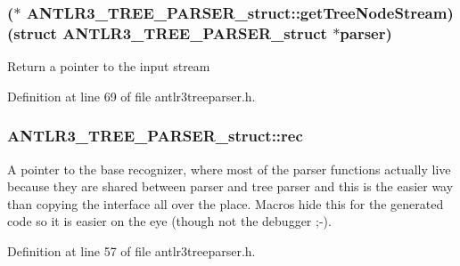 \hypertarget{struct_a_n_t_l_r3___t_r_e_e___p_a_r_s_e_r__struct_a13ab4351ee6aaf51e18e26f2bddc109d}{
\subsubsection[{get\-Tree\-Node\-Stream}]{($\ast$ A\-N\-T\-L\-R3\-\_\-\-T\-R\-E\-E\-\_\-\-P\-A\-R\-S\-E\-R\-\_\-struct\-::get\-Tree\-Node\-Stream)(struct {\bf A\-N\-T\-L\-R3\-\_\-\-T\-R\-E\-E\-\_\-\-P\-A\-R\-S\-E\-R\-\_\-struct} $\ast$parser)}}\label{struct_a_n_t_l_r3___t_r_e_e___p_a_r_s_e_r__struct_a13ab4351ee6aaf51e18e26f2bddc109d}
Return a pointer to the input stream 

Definition at line 69 of file antlr3treeparser.\-h.

\hypertarget{struct_a_n_t_l_r3___t_r_e_e___p_a_r_s_e_r__struct_a2c91ea97da3628675b73dfd0818f697c}{
\subsubsection[{rec}]{ A\-N\-T\-L\-R3\-\_\-\-T\-R\-E\-E\-\_\-\-P\-A\-R\-S\-E\-R\-\_\-struct\-::rec}}\label{struct_a_n_t_l_r3___t_r_e_e___p_a_r_s_e_r__struct_a2c91ea97da3628675b73dfd0818f697c}
A pointer to the base recognizer, where most of the parser functions actually live because they are shared between parser and tree parser and this is the easier way than copying the interface all over the place. Macros hide this for the generated code so it is easier on the eye (though not the debugger ;-\/). 

Definition at line 57 of file antlr3treeparser.\-h.

